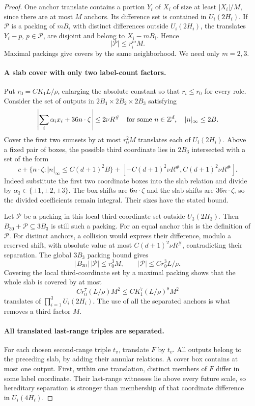 \begin{proof}
One anchor translate contains a portion $Y_i$ of $X_i$ of size at
least $|X_i|/M$, since there are at most $M$ anchors.  Its difference
set is contained in $U_i(2H_i)$.  If $\mathcal P$ is a packing of
$mB_i$ with distinct differences outside $U_i(2H_i)$, the translates
$Y_i-p$, $p\in\mathcal P$, are disjoint and belong to $X_i-mB_i$.
Hence
\[
 |\mathcal P|\leq r_i^m M.
\]
Maximal packings give covers by the same neighborhood.  We need
only $m=2,3$.

\paragraph{A slab cover with only two label-count factors.}
Put $r_0=CK_1L/\rho$, enlarging the absolute constant so that
$r_i\leq r_0$ for every role.  Consider the set of outputs in
$2B_1\times2B_2\times2B_3$ satisfying
\[
 \left|\sum_i\alpha_i x_i+36n\cdot\zeta\right|
       \leq2\nu R^\#
 \quad\text{for some }n\in\mathbb Z^d,\quad |n|_\infty\leq2B.
\]
Cover the first two sumsets by at most $r_0^2M$ translates each
of $U_i(2H_i)$.  Above a fixed pair of boxes, the possible third
coordinate lies in $2B_3$ intersected with a set of the form
\[
 c+\{n\cdot\zeta:|n|_\infty\leq C(d+1)^2B\}
       +[-C(d+1)^2\nu R^\#,C(d+1)^2\nu R^\#].
\]
Indeed substitute the first two coordinate boxes into the slab
relation and divide by $\alpha_3\in\{\pm1,\pm2,\pm3\}$.
The box shifts are $6n\cdot\zeta$ and the slab shifts are
$36n\cdot\zeta$, so the divided coefficients remain integral.
Their sizes have the stated bound.

Let $\mathcal P$ be a packing in this local third-coordinate set
outside $U_3(2H_3)$.  Then $B_{30}+\mathcal P\subseteq3B_3$ is
still such a packing.  For an equal anchor this is the definition
of $\mathcal P$.  For distinct anchors, a collision would express
their difference, modulo a reserved shift, with absolute value at
most $C(d+1)^2\nu R^\#$, contradicting their separation.  The
global $3B_3$ packing bound gives
\[
 |B_{30}|\,|\mathcal P|\leq r_0^3M,
 \qquad |\mathcal P|\leq Cr_0^3L/\rho.
\]
Covering the local third-coordinate set by a maximal packing shows
that the whole slab is covered by at most
\[
 C r_0^7(L/\rho)M^2
 \leq C K_1^7(L/\rho)^8M^2
\]
translates of $\prod_{i=1}^3U_i(2H_i)$.  The use of all the
separated anchors is what removes a third factor $M$.

\paragraph{All translated last-range triples are separated.}
For each chosen second-range triple $t_v$, translate $F$ by $t_v$.
All outputs belong to the preceding slab, by adding their annular
relations.  A cover box contains at most one output.  First, within
one translation, distinct members of $F$ differ in some label
coordinate.  Their last-range witnesses lie above every future
scale, so hereditary separation is stronger than membership of
that coordinate difference in $U_i(4H_i)$.


\end{proof}
